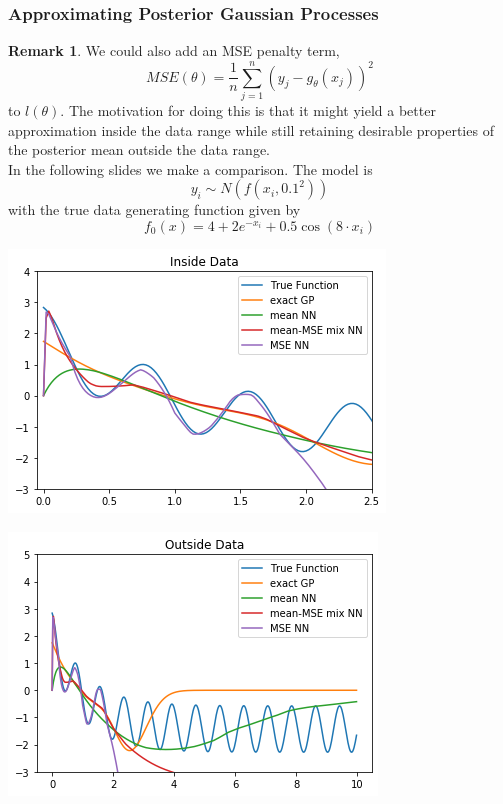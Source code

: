 \documentclass[notheorems]{beamer}
\theoremstyle{definition}
\newtheorem{rem}[definition]{Remark}
\begin{document}
\begin{frame}
\frametitle{Approximating Posterior Gaussian Processes}
\begin{rem}
We could also add an MSE penalty term, $$MSE(\theta) = \frac{1}{n} \sum_{j=1}^n (y_j - g_{\theta}(x_j))^2$$ to $l(\theta)$. The motivation for doing this is that it might yield a better approximation inside the data range while still retaining desirable properties of the posterior mean outside the data range. \\
In the following slides we make a comparison. The model is $$y_i \sim N(f(x_i, 0.1^2))$$ with the true data generating function given by $$f_0(x) = 4 + 2e^{-x_i} + 0.5\cos(8  \cdot x_i)$$
\end{rem}
\end{frame}
















\begin{frame}
\includegraphics[scale=.85]{inside_data.png}
\end{frame}



\begin{frame}
\includegraphics[scale=.85]{outside_data.png}
\end{frame}
\end{document}

